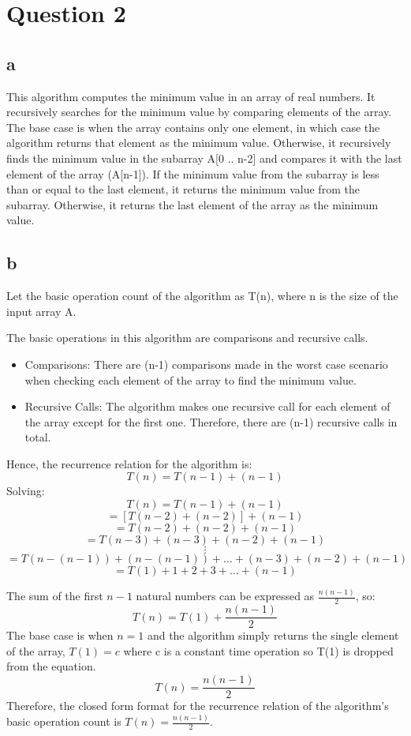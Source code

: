 \documentclass{article}
\begin{document}
\section*{Question 2}
\subsection*{a}This algorithm computes the minimum value in an array of real numbers.
It recursively searches for the minimum value by comparing elements of the array.
The base case is when the array contains only one element, in which case the algorithm returns that element as the minimum value.
Otherwise, it recursively finds the minimum value in the subarray A[0 .. n-2] and compares it with the last element of the array (A[n-1]).
If the minimum value from the subarray is less than or equal to the last element, it returns the minimum value from the subarray.
Otherwise, it returns the last element of the array as the minimum value.

\subsection*{b}
Let the basic operation count of the algorithm as T(n), where n is the size of the input array A.

The basic operations in this algorithm are comparisons and recursive calls.
\begin{itemize}
    \item Comparisons: There are (n-1) comparisons made in the worst case scenario when checking each element of the array to find the minimum value.
    \item Recursive Calls: The algorithm makes one recursive call for each element of the array except for the first one. Therefore, there are (n-1) recursive calls in total.
\end{itemize}
Hence, the recurrence relation for the algorithm is:
\[ T(n) = T(n-1) + (n-1) \]
Solving:
\[ T(n) = T(n-1) + (n-1) \]
\[ = [T(n-2) + (n-2)] + (n-1) \]
\[ = T(n-2) + (n-2) + (n-1) \]
\[ = T(n-3) + (n-3) + (n-2) + (n-1) \]
\[ \vdots \]
\[ = T(n-(n-1)) + (n-(n-1)) + \dots + (n-3) + (n-2) + (n-1) \]
\[ = T(1) + 1 + 2 + 3 + \dots + (n-1) \]

The sum of the first \( n-1 \) natural numbers can be expressed as \( \frac{n(n-1)}{2} \), so:
\[ T(n) = T(1) + \frac{n(n-1)}{2} \]
The base case is when \( n = 1 \) and the algorithm simply returns the single element of the array, \( T(1) = c \) where c is a constant time operation so T(1) is dropped from the equation.
\[ T(n) = \frac{n(n-1)}{2} \]
Therefore, the closed form format for the recurrence relation of the algorithm's basic operation count is \( T(n) = \frac{n(n-1)}{2} \).
\end{document}
